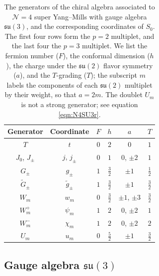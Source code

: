 \documentclass[12pt]{article}
\numberwithin{equation}{section}
\numberwithin{figure}{section}
\theoremstyle{plain}
\theoremstyle{definition}
\begin{document}
\begin{table}[H]
    \centering
    \begin{threeparttable}
    \begin{tabular}{cccccc}
        \toprule
        Generator & Coordinate & $F$ & $h$ & $a$ & $T$ \\\midrule
        $T$ & $t$ & $0$ & $2$ & $0$ & $1$ \\[1pt]
        $J_0$, $J_\pm$ & $j$, $j_\pm$ & $0$ & $1$ & $0$, $\pm 2$ & $1$ \\[1pt]
        $G_\pm$ & $g_\pm$ & $1$ & $\frac{3}{2}$ & $\pm 1$ & $\frac{1}{2}$ \\[3pt]
        $\widetilde{G}_\pm$ & $\widetilde{g}_\pm$ & $1$ & $\frac{3}{2}$ & $\pm 1$ & $\frac{3}{2}$ \\[3pt]
        $W_m$ & $w_m$ & $0$ & $\frac{3}{2}$ & $\pm 1$, $\pm 3$ & $\frac{3}{2}$ \\[3pt]
        $W^+_m$ & $\psi_m$ & $1$ & $2$ & $0$, $\pm 2$ & $1$ \\[1pt]
        $W^-_m$ & $\chi_m$ & $1$ & $2$ & $0$, $\pm 2$ & $2$ \\[1pt]
        $U_m$ & $u_m$ & $0$ & $\frac{5}{2}$ & $\pm 1$ & $\frac{3}{2}$ \\\bottomrule
    \end{tabular}
    \end{threeparttable}
    \caption{The generators of the chiral algebra associated to $\mathcal{N}=4$ super Yang--Mills with gauge algebra $\mathfrak{su}(3)$, and the corresponding coordinates of $S_0$. The first four rows form the $p = 2$ multiplet, and the last four the $p = 3$ multiplet. We list the fermion number ($F$), the conformal dimension ($h$), the charge under the $\mathfrak{su}(2)$ flavor symmetry ($a$), and the $T$-grading ($T$); the subscript $m$ labels the components of each $\mathfrak{su}(2)$ multiplet by their weight, so that $a = 2m$. The doublet $U_m$ is not a strong generator; see equation \eqref{eqn:N4SU3r}.}
    \label{tbl:N4SU3SG}
\end{table}

\subsection{Gauge algebra \texorpdfstring{$\mathfrak{su}(3)$}{su(3)}}\label{sec:N4su3}
\end{document}
